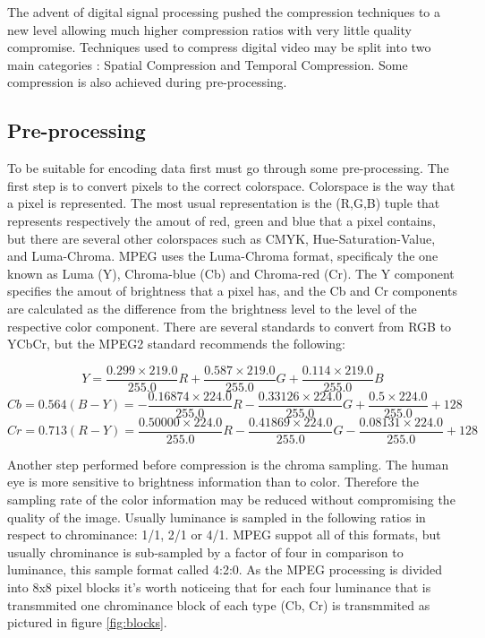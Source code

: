 \documentclass[a4paper, 12pt]{article}
\begin{document}
	The advent of digital signal processing pushed the compression techniques to a new level allowing much higher compression ratios with very little quality compromise. Techniques used to compress digital video may be split into two main categories \cite{mpegbook}: Spatial Compression and Temporal Compression. Some compression is also achieved during pre-processing.

\subsection{Pre-processing}

	To be suitable for encoding data first must go through some pre-processing. The first step is to convert pixels to the correct colorspace. Colorspace is the way that a pixel is represented. The most usual representation is the (R,G,B) tuple that represents respectively the amout of red, green and blue that a pixel contains, but there are several other colorspaces such as CMYK, Hue-Saturation-Value, and Luma-Chroma. MPEG uses the Luma-Chroma format, specificaly the one known as Luma (Y), Chroma-blue (Cb) and Chroma-red (Cr). The Y component specifies the amout of brightness that a pixel has, and the Cb and Cr components are calculated as the difference from the brightness level to the level of the respective color component. There are several standards to convert from RGB to YCbCr, but the MPEG2 standard recommends the following:

$$ Y=\frac{0.299\times219.0}{255.0}R + \frac{0.587\times219.0}{255.0}G + \frac{0.114\times219.0}{255.0}B $$
\vspace{0.5cm}
$$ Cb = 0.564(B-Y)  = - \frac{0.16874\times224.0}{255.0}R - \frac{0.33126\times224.0}{255.0}G + \frac{0.5\times224.0}{255.0} + 128 $$
\vspace{0.5cm}
$$ Cr = 0.713(R-Y)  = \frac{0.50000\times224.0}{255.0}R - \frac{0.41869\times224.0}{255.0}G - \frac{0.08131\times224.0}{255.0} + 128 $$

\vspace{1cm}

	Another step performed before compression is the chroma sampling. The human eye is more sensitive to brightness information than to color. Therefore the sampling rate of the color information may be reduced without compromising the quality of the image. Usually luminance is sampled in the following ratios in respect to chrominance: 1/1, 2/1 or 4/1. MPEG suppot all of this formats, but usually chrominance is sub-sampled by a factor of four in comparison to luminance, this sample format called 4:2:0. As the MPEG processing is divided into 8x8 pixel blocks it's worth noticeing that for each four luminance that is transmmited one chrominance block of each type (Cb, Cr) is transmmited as pictured in figure \ref{fig:blocks}.
\end{document}
